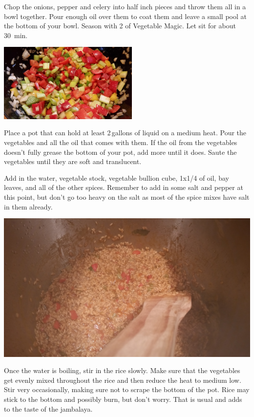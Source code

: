 \begin{recipe}
{		\step Chop the onions, pepper and celery into half inch pieces and throw them all in a bowl together. Pour enough oil over them to coat them and leave a small pool at the bottom of your bowl. Season with \SI{2}{\tablespoon} of Vegetable Magic. Let sit for about \SI{30}{\minute}.

		\includegraphics[width=0.52\textwidth]{cajun_jambalaya/20150829_181324.jpg}

		\step Place a pot that can hold at least 2\,gallons of liquid on a medium heat. Pour the vegetables and all the oil that comes with them. If the oil from the vegetables doesn't fully grease the bottom of your pot, add more until it does. Saute the vegetables until they are soft and translucent.

		\step Add in the water, vegetable stock, vegetable bullion cube, \SI{1x1/4}{\cup} of oil, bay leaves, and all of the other spices. Remember to add in some salt and pepper at this point, but don't go too heavy on the salt as most of the spice mixes have salt in them already.

		\includegraphics[width=\textwidth]{cajun_jambalaya/20150829_195533.jpg}

		\step Once the water is boiling, stir in the rice slowly. Make sure that the vegetables get evenly mixed throughout the rice and then reduce the heat to medium low. Stir very occasionally, making sure not to scrape the bottom of the pot. Rice may stick to the bottom and possibly burn, but don’t worry. That is usual and adds to the taste of the jambalaya.

}
\end{recipe}
